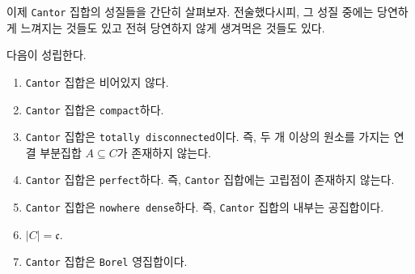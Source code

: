 이제 \texttt{Cantor} 집합의 성질들을 간단히 살펴보자. 전술했다시피, 그 성질 중에는 당연하게 느껴지는 것들도 있고 전혀 당연하지 않게 생겨먹은 것들도 있다.

\begin{theorem}
    다음이 성립한다.
    \begin{enumerate}
        \item \texttt{Cantor} 집합은 비어있지 않다.
        \item \texttt{Cantor} 집합은 \texttt{compact}하다.
        \item \texttt{Cantor} 집합은 \texttt{totally disconnected}이다. 즉, 두 개 이상의 원소를 가지는 연결 부분집합 $A\subseteq C$가 존재하지 않는다.
        \item \texttt{Cantor} 집합은 \texttt{perfect}하다. 즉, \texttt{Cantor} 집합에는 고립점이 존재하지 않는다.
        \item \texttt{Cantor} 집합은 \texttt{nowhere dense}하다. 즉, \texttt{Cantor} 집합의 내부는 공집합이다.
        \item $|C|=\mathfrak{c}$.
        \item \texttt{Cantor} 집합은 \texttt{Borel} 영집합이다.
    \end{enumerate}
\end{theorem}

